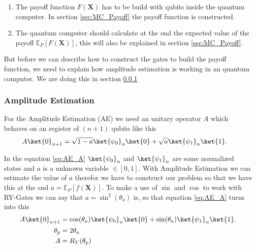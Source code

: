 \documentclass[../../main.tex]{subfiles}
\begin{document}
\begin{enumerate}
	\item The payoff function $F(\textbf{X})$ has to be build with qubits inside the quantum computer. In section \ref{sec:MC_Payoff} the payoff function is constructed.
	\item The quantum computer should calculate at the end the expected value of the payoff $\mathbb{E}_P[F(\textbf{X})]$, this will also be explained in section \ref{sec:MC_Payoff}.
\end{enumerate}
But before we can describe how to construct the gates to build the payoff function, we need to explain how amplitude estimation is working in an quantum computer. We are doing this in section \ref{sec:MC_AE}

\subsubsection{Amplitude Estimation}\label{sec:MC_AE}
For the Amplitude Estimation (AE) we need an unitary operator $A$ which behaves on an register of $(n+1)$ qubits like this
\begin{align}
    A\ket{0}_{n+1} &= \sqrt{1-a}\ket{\psi_0}_{n}\ket{0}+\sqrt{a}\ket{\psi_1}_{n}\ket{1}. \label{eq:AE_A}
\end{align}

In the equation \ref{eq:AE_A} $\ket{\psi_0}_{n}$ and $\ket{\psi_1}_{n}$ are some normalized states and $a$ is a unknown variable $\in [0,1]$.
With Amplitude Estimation we can estimate the value of $a$ therefor we have to construct our problem so that we have this at the end $a=\mathbb{E}_P[f(\textbf{X})]$.
To make a use of $\sin$ and $\cos$ to work with RY-Gates we can say that $a=\sin^2(\theta_a)$ is, so that equation \ref{eq:AE_A} turns into this
\begin{align}
    A\ket{0}_{n+1} &= \cos(\theta_a)\ket{\psi_0}_{n}\ket{0}+\sin(\theta_a)\ket{\psi_1}_{n}\ket{1}. \label{eq:AE_A_sin} \\
    \theta_p &= 2 \theta_a \nonumber \\
    A &= R_Y(\theta_p)
\end{align}
\end{document}
